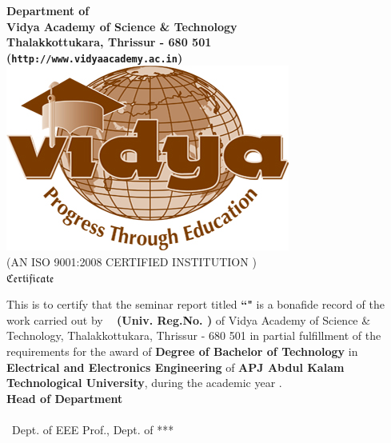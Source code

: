 
\begin{titlepage}
	


\begin{center}


{\Large \bf Department of \vdept  }\\
{\Large \bf Vidya Academy of Science \& Technology}\\
{\normalsize \bf Thalakkottukara, Thrissur - 680 501\\
({\tt http://www.vidyaacademy.ac.in})}\\[0.75cm]
%
%
\includegraphics[width=3.5 cm]{layout_files/VidyaLogo.JPG}\\
\scriptsize (AN ISO 9001:2008 CERTIFIED INSTITUTION )\\[1 cm]
%
 \Huge  $ \mathfrak{Certificate}$\\[0.5cm]
%
\end{center}

\quad This is to certify that the seminar report titled {\bf ``\vtitle"} is a bonafide record of the work carried out by {\bf \vauthor\ } {\bf (Univ. Reg.No. \vregisternumber) } of Vidya Academy of Science \& Technology, Thalakkottukara, Thrissur - 680 501 in partial fulfillment of the requirements for the award of {\bf Degree of Bachelor of Technology} in {\bf Electrical and Electronics Engineering} of  {\bf APJ Abdul Kalam Technological University}, during the academic year \vacademicyear. \\[2 cm]
 
 \hfill  {\bf Head of Department} \\[.3cm]
\noindent \vguide \hfill \vhod \\ \vguidedg\ Dept. of EEE \hfill Prof., Dept. of ***  



%
\end{titlepage}

%  